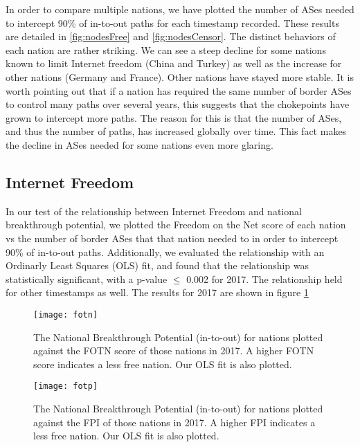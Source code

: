 \par
In order to compare multiple nations, we have plotted the number of ASes needed to intercept 90\% of in-to-out paths
for each timestamp recorded. These results are detailed in \figurename \ref{fig:nodesFree} and \figurename \ref{fig:nodesCensor}.
The distinct behaviors of each nation are rather striking. We can see a steep decline for some
nations known to limit Internet freedom (China and Turkey) as well as the increase for other nations
(Germany and France). Other nations have stayed more stable. It is worth pointing out that if a nation
has required the same number of border ASes to control many paths over several years, this suggests
that the chokepoints have grown to intercept more paths. The reason for this is that the number of ASes,
and thus the number of paths, has increased globally over time. This fact makes the decline in ASes
needed for some nations even more glaring.


\subsection{Internet Freedom}

In our test of the relationship between Internet Freedom and national breakthrough potential, we plotted the Freedom on the Net score
of each nation vs the number of border ASes that that nation needed to in order to intercept 90\% of in-to-out paths. Additionally,
we evaluated the relationship with an Ordinarly Least Squares (OLS) fit, and found that the relationship was statistically significant,
with a p-value $\leq$ 0.002 for 2017. The relationship held for other timestamps as well. The results for 2017 are shown in figure \ref{fig:fotn}

\begin{figure}
	\centering
	\texttt{[image: fotn]}
	\caption{The National Breakthrough Potential (in-to-out) for nations plotted against the FOTN score
	of those nations in 2017. A higher FOTN score indicates a less free nation. Our OLS fit is also plotted.}\label{fig:fotn}
\end{figure}

\begin{figure}
	\centering
	\texttt{[image: fotp]}
	\caption{The National Breakthrough Potential (in-to-out) for nations plotted against the FPI
	of those nations in 2017. A higher FPI indicates a less free nation. Our OLS fit is also plotted.}\label{fig:fotp}
\end{figure}

